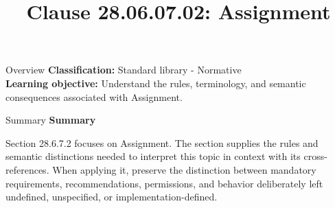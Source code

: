 \documentclass[10pt,letterpaper]{article}
\title{Clause 28.06.07.02: Assignment}
\author{}
\date{}
\begin{document}
\maketitle
\begin{CornellOverviewBox}{Overview}
\textbf{Classification:} Standard library - Normative\\[2pt]
\textbf{Learning objective:} Understand the rules, terminology, and semantic consequences associated with Assignment.
\end{CornellOverviewBox}\begin{CornellSummaryBox}{Summary}
{\sffamily\bfseries\color{Accent} Summary}\par\vspace{3pt}Section 28.6.7.2 focuses on Assignment. The section supplies the rules and semantic distinctions needed to interpret this topic in context with its cross-references. When applying it, preserve the distinction between mandatory requirements, recommendations, permissions, and behavior deliberately left undefined, unspecified, or implementation-defined.
\end{CornellSummaryBox}
\end{document}
